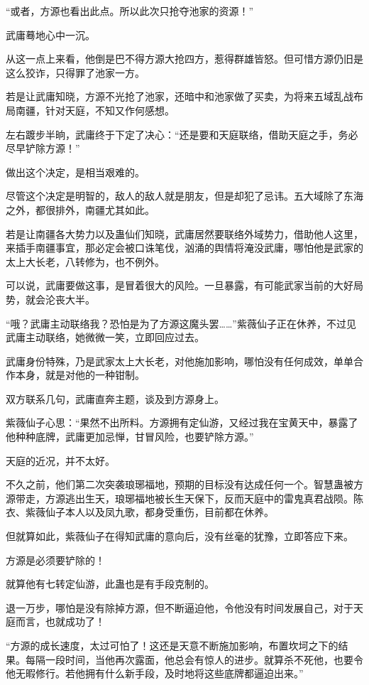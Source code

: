 \begin{this_body}
“或者，方源也看出此点。所以此次只抢夺池家的资源！”

武庸蓦地心中一沉。

从这一点上来看，他倒是巴不得方源大抢四方，惹得群雄皆怒。但可惜方源仍旧是这么狡诈，只得罪了池家一方。

若是让武庸知晓，方源不光抢了池家，还暗中和池家做了买卖，为将来五域乱战布局南疆，针对天庭，不知又作何感想。

左右踱步半晌，武庸终于下定了决心：“还是要和天庭联络，借助天庭之手，务必尽早铲除方源！”

做出这个决定，是相当艰难的。

尽管这个决定是明智的，敌人的敌人就是朋友，但是却犯了忌讳。五大域除了东海之外，都很排外，南疆尤其如此。

若是让南疆各大势力以及蛊仙们知晓，武庸居然要联络外域势力，借助他人这里，来插手南疆事宜，那必定会被口诛笔伐，汹涌的舆情将淹没武庸，哪怕他是武家的太上大长老，八转修为，也不例外。

可以说，武庸要做这事，是冒着很大的风险。一旦暴露，有可能武家当前的大好局势，就会沦丧大半。

“哦？武庸主动联络我？恐怕是为了方源这魔头罢……”紫薇仙子正在休养，不过见武庸主动联络，她微微一笑，立即回应过去。

武庸身份特殊，乃是武家太上大长老，对他施加影响，哪怕没有任何成效，单单合作本身，就是对他的一种钳制。

双方联系几句，武庸直奔主题，谈及到方源身上。

紫薇仙子心思：“果然不出所料。方源拥有定仙游，又经过我在宝黄天中，暴露了他种种底牌，武庸更加忌惮，甘冒风险，也要铲除方源。”

天庭的近况，并不太好。

不久之前，他们第二次突袭琅琊福地，预期的目标没有达成任何一个。智慧蛊被方源带走，方源逃出生天，琅琊福地被长生天保下，反而天庭中的雷鬼真君战陨。陈衣、紫薇仙子本人以及凤九歌，都身受重伤，目前都在休养。

但就算如此，紫薇仙子在得知武庸的意向后，没有丝毫的犹豫，立即答应下来。

方源是必须要铲除的！

就算他有七转定仙游，此蛊也是有手段克制的。

退一万步，哪怕是没有除掉方源，但不断逼迫他，令他没有时间发展自己，对于天庭而言，也就成功了！

“方源的成长速度，太过可怕了！这还是天意不断施加影响，布置坎坷之下的结果。每隔一段时间，当他再次露面，他总会有惊人的进步。就算杀不死他，也要令他无暇修行。若他拥有什么新手段，及时地将这些底牌都逼迫出来。”


\end{this_body}
